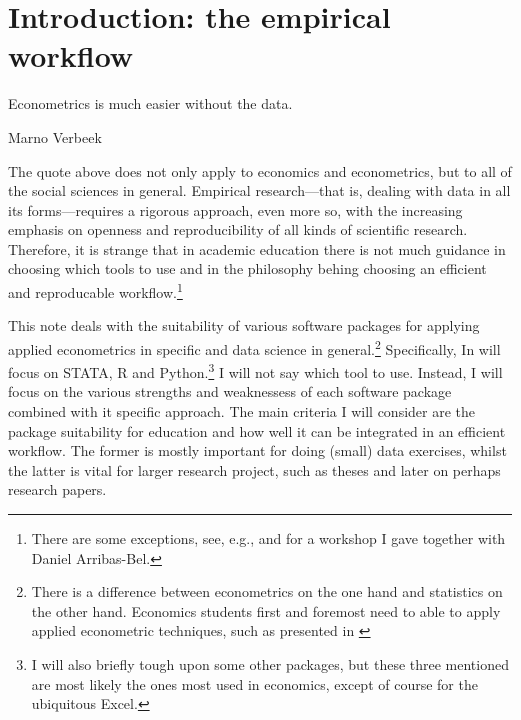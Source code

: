 \documentclass[fleqn,10pt]{SelfArx} %
\affiliation{\textsuperscript{1}\textit{Department of Spatial Economics, Vrije Universiteit Amsterdam, Amsterdam, The Netherlands}} %
\affiliation{*\textbf{Corresponding author}: \Letter{} t.de.graaff@vu.nl; \Mundus{} \href{thomasdegraaff.nl}{thomasdegraaff.nl}} %
\begin{document}
\maketitle %
\thispagestyle{empty} %


\section*{Introduction: the empirical workflow} %

\epigraph{Econometrics is much easier without the data.}{Marno Verbeek}

The quote above does not only apply to economics and econometrics, but to all of
the social sciences in general. Empirical research---that is, dealing with data in
all its forms---requires a rigorous approach, even more so, with the increasing
emphasis on openness and reproducibility of all kinds of scientific research. Therefore, it is strange
that in academic education there is not much guidance in choosing which tools to
use and in the philosophy behing choosing an efficient and reproducable
workflow.\footnote{There are some exceptions, see, e.g.,
  \citet{healy2011choosing} and \citet{Arribas-Bel2014misc} for a workshop I gave together with Daniel Arribas-Bel.}

This note deals with the suitability of various software packages for applying
applied econometrics in specific and data science in general.\footnote{There
  is a difference between econometrics on the one hand and statistics on the
  other hand. Economics students first and foremost need to able to apply
  applied econometric techniques, such as presented in
  \citet{angrist2008mostly}}
Specifically, In will focus on STATA, R and Python.\footnote{I will also briefly
  tough upon some other packages, but these three mentioned are most likely the
  ones most used in economics, except of course for the ubiquitous Excel.}
I will not say which tool to use. Instead, I will focus on the various strengths
and weaknessess of each software package combined with it specific approach. The
main criteria I will consider are the package suitability for education and how
well it can be integrated in an efficient workflow. The former is mostly
important for doing (small) data exercises, whilst the latter is vital for
larger research project, such as theses and later on perhaps research papers.  
\end{document}
